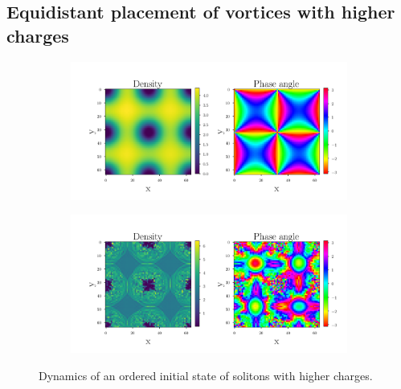 \subsection{Equidistant placement of vortices with higher charges}
 \begin{figure}[H]
 \centering
 \begin{subfigure}{0.49\textwidth} 
 	\includegraphics[width= \textwidth]{figures/vortex_3_0}
 \end{subfigure}
 \begin{subfigure}{0.49\textwidth} 
 	\includegraphics[width= \textwidth]{figures/vortex_3_50}
 \end{subfigure}
 \caption{Dynamics of an ordered initial state of solitons with higher charges.}	
 \end{figure}